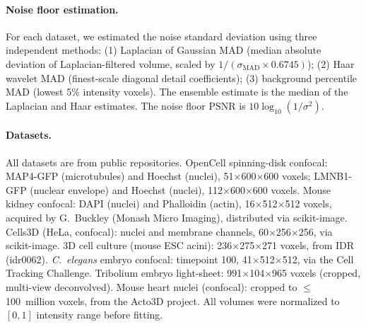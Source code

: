 \paragraph{Noise floor estimation.}
For each dataset, we estimated the noise standard deviation using three independent methods: (1) Laplacian of Gaussian MAD (median absolute deviation of Laplacian-filtered volume, scaled by $1/(\sigma_\text{MAD} \times 0.6745)$); (2) Haar wavelet MAD (finest-scale diagonal detail coefficients); (3) background percentile MAD (lowest 5\% intensity voxels).
The ensemble estimate is the median of the Laplacian and Haar estimates.
The noise floor PSNR is $10\log_{10}(1/\sigma^2)$.

\paragraph{Datasets.}
All datasets are from public repositories.
OpenCell spinning-disk confocal\cite{cho2022opencell}: MAP4-GFP (microtubules) and Hoechst (nuclei), 51$\times$600$\times$600 voxels; LMNB1-GFP (nuclear envelope) and Hoechst (nuclei), 112$\times$600$\times$600 voxels.
Mouse kidney confocal: DAPI (nuclei) and Phalloidin (actin), 16$\times$512$\times$512 voxels, acquired by G.~Buckley (Monash Micro Imaging), distributed via scikit-image\cite{vanderWalt2014scikit}.
Cells3D (HeLa, confocal): nuclei and membrane channels, 60$\times$256$\times$256, via scikit-image\cite{vanderWalt2014scikit}.
3D cell culture (mouse ESC acini)\cite{blin2019nessys}: 236$\times$275$\times$271 voxels, from IDR (idr0062).
\emph{C.~elegans} embryo confocal\cite{murray2008celegans}: timepoint 100, 41$\times$512$\times$512, via the Cell Tracking Challenge\cite{maska2023celltracking}.
Tribolium embryo light-sheet: 991$\times$104$\times$965 voxels (cropped, multi-view deconvolved)\cite{preibisch2014efficient}.
Mouse heart nuclei (confocal): cropped to ${\leq}$100~million voxels, from the Acto3D project.
All volumes were normalized to $[0, 1]$ intensity range before fitting.
